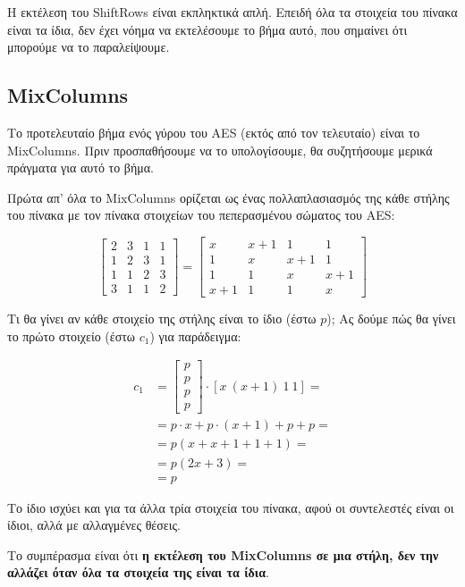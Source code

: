 \documentclass{article}
\begin{document}
Η εκτέλεση του ShiftRows είναι εκπληκτικά απλή. Επειδή όλα τα στοιχεία του πίνακα είναι τα ίδια, δεν έχει νόημα να εκτελέσουμε το βήμα αυτό, που σημαίνει ότι μπορούμε να το παραλείψουμε.

\subsection*{MixColumns}

Το προτελευταίο βήμα ενός γύρου του AES (εκτός από τον τελευταίο) είναι το MixColumns. Πριν προσπαθήσουμε να το υπολογίσουμε, θα συζητήσουμε μερικά πράγματα για αυτό το βήμα.

Πρώτα απ' όλα το MixColumns ορίζεται ως ένας πολλαπλασιασμός της κάθε στήλης του πίνακα με τον πίνακα στοιχείων του πεπερασμένου σώματος του AES:

$$
\begin{bmatrix}
2 & 3 & 1 & 1 \\
1 & 2 & 3 & 1 \\
1 & 1 & 2 & 3 \\
3 & 1 & 1 & 2
\end{bmatrix} =
\begin{bmatrix}
x & x + 1 & 1 & 1 \\
1 & x & x + 1 & 1 \\
1 & 1 & x & x + 1 \\
x + 1 & 1 & 1 & x
\end{bmatrix}
$$

Τι θα γίνει αν κάθε στοιχείο της στήλης είναι το ίδιο (έστω $p$); Ας δούμε πώς θα γίνει το πρώτο στοιχείο (έστω $c_1$) για παράδειγμα:

\begin{align*}
c_1 &= \begin{bmatrix} p \\ p \\ p \\ p \end{bmatrix} \cdot [x \ (x + 1) \ 1 \ 1] = \\
    &= p \cdot x + p \cdot (x + 1) + p + p = \\
    &= p ( x + x + 1 + 1 + 1) = \\
    &= p (2x + 3) = \\
    &= p
\end{align*}

Το ίδιο ισχύει και για τα άλλα τρία στοιχεία του πίνακα, αφού οι συντελεστές είναι οι ίδιοι, αλλά με αλλαγμένες θέσεις.

Το συμπέρασμα είναι ότι \textbf{η εκτέλεση του MixColumns σε μια στήλη, δεν την αλλάζει όταν όλα τα στοιχεία της είναι τα ίδια}.
\end{document}
